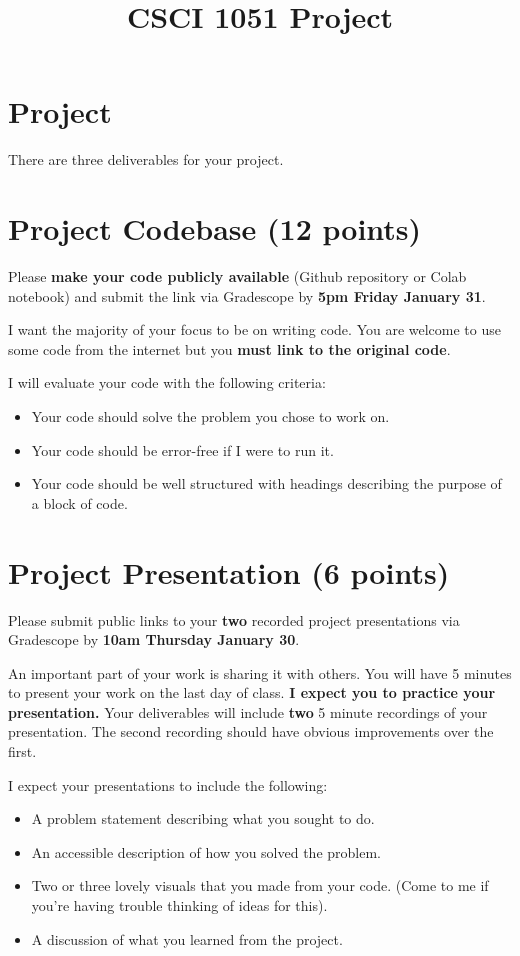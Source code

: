 \documentclass{article}
\title{CSCI 1051 Project}
\date{}
\begin{document}
\maketitle

\section*{Project}

There are three deliverables for your project.

\section{Project Codebase (12 points)}
Please \textbf{make your code publicly available} (Github repository
or Colab notebook) and submit the link via Gradescope by
\textbf{5pm Friday January 31}.

I want the majority of your focus to be on writing code.
You are welcome to use some code from the internet but you
\textbf{must link to the original code}.

I will evaluate your code with the following criteria:
\begin{itemize}
    \item Your code should solve the problem you chose to work on.
    \item Your code should be error-free if I were to run it.
    \item Your code should be well structured with headings describing 
    the purpose of a block of code.
\end{itemize}

\section{Project Presentation (6 points)}
Please submit public links to your \textbf{two} recorded
project presentations via Gradescope by \textbf{10am Thursday January 30}.

An important part of your work is sharing it with others.
You will have 5 minutes to present your work on the last day of class.
\textbf{I expect you to practice your presentation.}
Your deliverables will include \textbf{two} 5 minute recordings of your presentation.
The second recording should have obvious improvements over the first.

I expect your presentations to include the following:
\begin{itemize}
    \item A problem statement describing what you sought to do.
    \item An accessible description of how you solved the problem.
    \item Two or three lovely visuals that you made from your code.
    (Come to me if you're having trouble thinking of ideas for this).
    \item A discussion of what you learned from the project.
\end{itemize}
\end{document}
